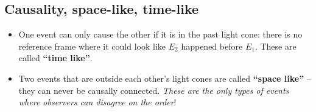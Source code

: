 \documentclass[aspectratio=169,
hyperref={colorlinks,urlcolor=blue}
]{beamer}
\begin{document}




\subsection{Causality, space-like, time-like}
\label{subsec:causalityspaceliketimelike}
{
\begin{itemize}
\item One event can only cause the other if it is in the past light cone: there is no reference frame where it could look like $E_2$ happened before $E_1$. These are called \textbf{“time like”}.
\item Two events that are outside each other’s light cones are called \textbf{“space like”} – they can never be causally connected. \emph{These are the only types of events where observers can disagree on the order}!
\end{itemize}
}
{
\centering
{}
}
\end{document}
